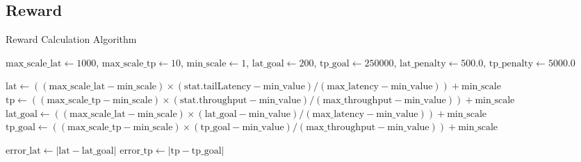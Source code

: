 \subsection{Reward}

\begin{algorithm}[ht]
  \caption{Reward Calculation Algorithm}
  \label{algo:reward_calculation}
  \SetAlgoLined
  $\text{max\_scale\_lat} \leftarrow 1000$, $\text{max\_scale\_tp} \leftarrow 10$, $\text{min\_scale} \leftarrow 1$, $\text{lat\_goal} \leftarrow 200$, $\text{tp\_goal} \leftarrow 250000$, $\text{lat\_penalty} \leftarrow 500.0$, $\text{tp\_penalty} \leftarrow 5000.0$\;
    
  $\text{lat} \leftarrow ((\text{max\_scale\_lat} - \text{min\_scale}) \times (\text{stat.tailLatency} - \text{min\_value}) / (\text{max\_latency} - \text{min\_value})) + \text{min\_scale}$\;
  $\text{tp} \leftarrow ((\text{max\_scale\_tp} - \text{min\_scale}) \times (\text{stat.throughput} - \text{min\_value}) / (\text{max\_throughput} - \text{min\_value})) + \text{min\_scale}$\;
  $\text{lat\_goal} \leftarrow ((\text{max\_scale\_lat} - \text{min\_scale}) \times (\text{lat\_goal} - \text{min\_value}) / (\text{max\_latency} - \text{min\_value})) + \text{min\_scale}$\;
  $\text{tp\_goal} \leftarrow ((\text{max\_scale\_tp} - \text{min\_scale}) \times (\text{tp\_goal} - \text{min\_value}) / (\text{max\_throughput} - \text{min\_value})) + \text{min\_scale}$\;
    
  $\text{error\_lat} \leftarrow |\text{lat} - \text{lat\_goal}|$\;
  $\text{error\_tp} \leftarrow |\text{tp} - \text{tp\_goal}|$\;
    

\end{algorithm}

